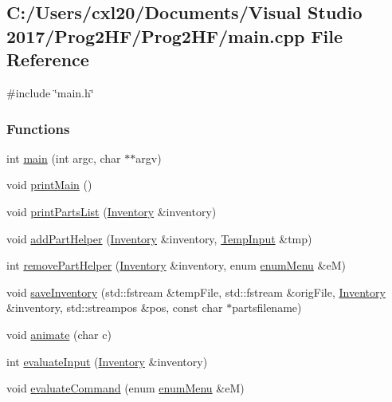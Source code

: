 \subsection{C\+:/\+Users/cxl20/\+Documents/\+Visual Studio 2017/\+Prog2\+H\+F/\+Prog2\+H\+F/main.cpp File Reference}
\label{main_8cpp}
{\ttfamily \#include \char`\"{}main.\+h\char`\"{}}\newline
\subsubsection*{Functions}
\begin{DoxyCompactItemize}
\item 
int \mbox{\hyperlink{main_8cpp_a3c04138a5bfe5d72780bb7e82a18e627}{main}} (int argc, char $\ast$$\ast$argv)
\item 
void \mbox{\hyperlink{main_8cpp_aa8348016f7273e63d47917126e8f9c69}{print\+Main}} ()
\item 
void \mbox{\hyperlink{main_8cpp_a70c4e63bce818eb0a35f6403066b4263}{print\+Parts\+List}} (\mbox{\hyperlink{class_inventory}{Inventory}} \&inventory)
\item 
void \mbox{\hyperlink{main_8cpp_ae49141c745f24fbddd6b3342b8a6cae0}{add\+Part\+Helper}} (\mbox{\hyperlink{class_inventory}{Inventory}} \&inventory, \mbox{\hyperlink{struct_temp_input}{Temp\+Input}} \&tmp)
\item 
int \mbox{\hyperlink{main_8cpp_ab1c45050c0d088f602e43276598cc469}{remove\+Part\+Helper}} (\mbox{\hyperlink{class_inventory}{Inventory}} \&inventory, enum \mbox{\hyperlink{main_8h_adbc27074b7dcd54cd4578936c6329d02}{enum\+Menu}} \&eM)
\item 
void \mbox{\hyperlink{main_8cpp_a0375d467e47b0258969791a9cb214150}{save\+Inventory}} (std\+::fstream \&temp\+File, std\+::fstream \&orig\+File, \mbox{\hyperlink{class_inventory}{Inventory}} \&inventory, std\+::streampos \&pos, const char $\ast$partsfilename)
\item 
void \mbox{\hyperlink{main_8cpp_a9752b4d9f8a092734d3a8ea49b63c42b}{animate}} (char c)
\item 
int \mbox{\hyperlink{main_8cpp_a39e6e00a3f83db932d706d1f00f040b7}{evaluate\+Input}} (\mbox{\hyperlink{class_inventory}{Inventory}} \&inventory)
\item 
void \mbox{\hyperlink{main_8cpp_af4bf55c7933ba857c5d67526038aed45}{evaluate\+Command}} (enum \mbox{\hyperlink{main_8h_adbc27074b7dcd54cd4578936c6329d02}{enum\+Menu}} \&eM)
\end{DoxyCompactItemize}


